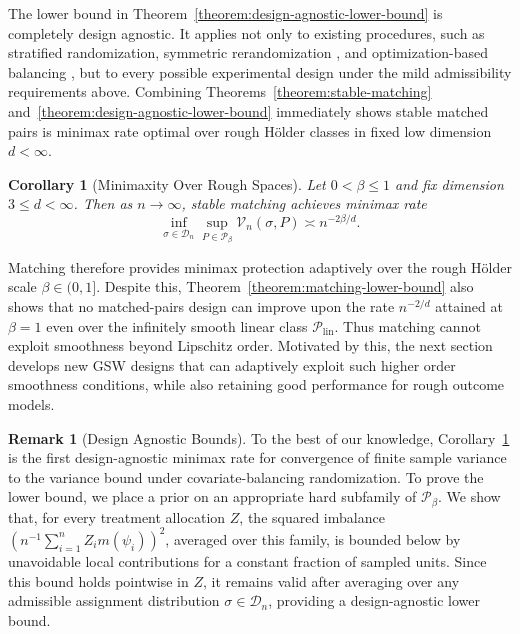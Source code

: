 \documentclass[letterpaper,12pt]{article}
\newtheorem{cor}[thm]{Corollary}
\theoremstyle{definition}
\newtheorem{remark}[thm]{Remark}
\numberwithin{equation}{section}
\newcommand{\mc}{\mathcal}
\begin{document}
The lower bound in Theorem~\ref{theorem:design-agnostic-lower-bound} is completely design agnostic.
It applies not only to existing procedures, such as stratified randomization, symmetric rerandomization \citep{li2018asymptotic}, and optimization-based balancing \citep{kallus2018}, but to every possible experimental design under the mild admissibility requirements above.
Combining Theorems~\ref{theorem:stable-matching} and~\ref{theorem:design-agnostic-lower-bound} immediately shows stable matched pairs is minimax rate optimal over rough H\"older classes in fixed low dimension $d < \infty$.

\begin{cor}[Minimaxity Over Rough Spaces]\label{corollary:minimax-matching}
Let $0<\beta\leq1$ and fix dimension $3\leq d<\infty$. 
Then as $n\to\infty$, stable matching achieves minimax rate
\begin{equation}\label{equation:minimax-matching}
\inf_{\sigma\in\mathcal D_n} \sup_{P\in\mathcal P_\beta}\mc V_n(\sigma,P) \asymp n^{-2\beta/d}.
\end{equation}
\end{cor}

Matching therefore provides minimax protection adaptively over the rough H\"older scale $\beta \in (0, 1]$.
Despite this, Theorem~\ref{theorem:matching-lower-bound} also shows that no matched-pairs design can improve upon the rate $n^{-2/d}$ attained at $\beta=1$ even over the infinitely smooth linear class $\mathcal P_{\mathrm{lin}}$.
Thus matching cannot exploit smoothness beyond Lipschitz order.
Motivated by this, the next section develops new GSW designs that can adaptively exploit such higher order smoothness conditions, while also retaining good performance for rough outcome models.

\begin{remark}[Design Agnostic Bounds]
To the best of our knowledge, Corollary~\ref{corollary:minimax-matching} is the first design-agnostic minimax rate for convergence of finite sample variance to the \cite{hahn1998} variance bound under covariate-balancing randomization. 
To prove the lower bound, we place a prior on an appropriate hard subfamily of $\mathcal P_\beta$.
We show that, for every treatment allocation $Z$, the squared imbalance $(n^{-1}\sum_{i=1}^nZ_im(\psi_i))^2$, averaged over this family, is bounded below by unavoidable local contributions for a constant fraction of sampled units.
Since this bound holds pointwise in $Z$, it remains valid after averaging over any admissible assignment distribution $\sigma\in\mathcal D_n$, providing a design-agnostic lower bound.
\end{remark}
\end{document}
